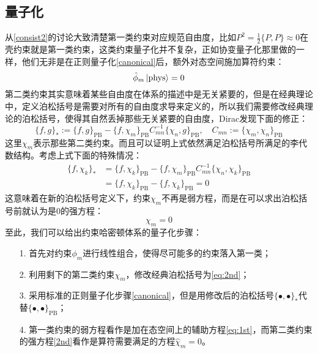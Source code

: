 \subsection{量子化}
从\ref{consist2}的讨论大致清楚第一类约束对应规范自由度，比如$P^2=\frac12\{P,P\}\approx 0$在壳约束就是第一类约束，这类约束量子化并不复杂，正如协变量子化那里做的一样，他们无非是在正则量子化\ref{canonical}后，额外对态空间施加算符约束：
\begin{equation}
	\label{eq:1st}
	\hat{\phi}_m\ket{\text{phys}} = 0
\end{equation}
第二类约束其实意味着某些自由度在体系的描述中是无关紧要的，但是在经典理论中，定义泊松括号是需要对所有的自由度求导来定义的，所以我们需要修改经典理论的泊松括号，使得其自然丢掉那些无关紧要的自由度，Dirac发现下面的修正：
\begin{equation}
	\label{eq:2nd}
	\{f,g\}_{*}:=\{f,g\}_{\mathrm{PB}}-\{f,\chi_m\}_{\mathrm{PB}}C_{mn}^{-1}\{\chi_n,g\}_{\mathrm{PB}},\quad C_{mn}:=\{\chi_m,\chi_n\}_\text{PB}
\end{equation}
这里$\chi_m$表示那些第二类约束。而且可以证明上式依然满足泊松括号所满足的李代数结构。考虑上式下面的特殊情况：
\begin{equation}
\begin{aligned}
		\{f,\chi_k\}_{*} &= \{f,\chi_k\}_{\mathrm{PB}} -\{f,\chi_m\}_{\mathrm{PB}}C_{mn}^{-1}\{\chi_n,\chi_k\}_{\mathrm{PB}}\\
	&=\{f,\chi_k\}_{\mathrm{PB}} -\{f,\chi_k\}_{\mathrm{PB}}=0
\end{aligned}
\end{equation}
这意味着在新的泊松括号定义下，约束$\chi_m$不再是弱方程，而是在可以求出泊松括号前就认为是$0$的强方程：
\begin{equation}
	\label{2nd}
	\chi_m = 0
\end{equation}
至此，我们可以给出约束哈密顿体系的量子化步骤：
\begin{itemize}
	\item[1.] 首先对约束$\phi_m$进行线性组合，使得尽可能多的约束落入第一类；
	\item[2.] 利用剩下的第二类约束$\chi_m$，修改经典泊松括号为\ref{eq:2nd}；
	\item[3.] 采用标准的正则量子化步骤\ref{canonical}，但是用修改后的泊松括号$\{\bullet,\bullet\}_*$代替$\{\bullet,\bullet\}_{\mathrm{PB}}$；
	\item[4.] 第一类约束的弱方程看作是加在态空间上的辅助方程\ref{eq:1st}，而第二类约束的强方程\ref{2nd}看作是算符需要满足的方程$\hat{\chi}_m =0$。
\end{itemize}
